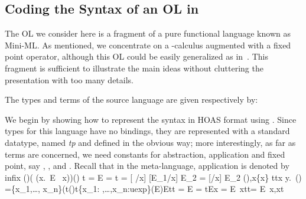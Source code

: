 \documentclass[final]{svjour3}
\begin{document}
\subsection{Coding the Syntax of an OL in \hybrid}
\label{ssec:coding}

The OL we consider here is a fragment of
a pure functional language known as Mini-ML\@.  As mentioned, we
concentrate on a -calculus augmented with a fixed point operator,
although this OL could be easily generalized as in~\cite{Pfenning01book}.
This fragment is sufficient to illustrate the main ideas without
cluttering the presentation with too many details.


The types and terms of the source language are given respectively by:

We begin by showing how to represent the syntax in HOAS format using
\hybrid. Since  types for this language have no
bindings, they are represented with a standard datatype, named
\textit{tp} and defined in the obvious way;
more interestingly, as far as terms are
concerned, we need constants for
abstraction,   application and fixed point, say ,
, and .
Recall that in the meta-language, application is denoted by infix
\con{}()( (\lambda x.\ E
\ x))()\lambda\lambda\lambda\lambda\encode{\Gamma}
{\cdot}\Gamma\decode{\Gamma} \cdott\Gamma{}\alpha\GammaE\Gamma{}t\encode{} = E\decode{} = t\encode{\cdot}{\cdot}\decode{\cdot}{\cdot}\encode {} = {[\encode
    /x]} \; \encode {}\decode \Gamma
  {[E_1/x] {E_2}} = {[\decode {}/x]} \; \decode \Gamma
  {E_2} {()}\expr{}\Gamma,x\Gamma\cup \{x\}\Gamma\uexp{\isterm{\_}{\_}} \fs \bool\uexp\Gamma\vdash tt\lambda x y.\, (\expr\fs\expr\fs\expr)\fs\expr\abst{}{} \Gamma=\{x_1,\ldots, x_n\}(\proper \Gamma{}\Gamma\vdash t(\proper\Gamma\Implies{})\Gamma\vdash t\Gamma \{x_1: \uexp,\dots,x_n:uexp\}(\proper\Gamma\Implies\isterm\Gamma E)\decode\Gamma Et\Gamma\vdash t\encode\Gamma{\decode
  \Gamma E} = E\decode\Gamma{\encode \Gamma t} = t\proper\Gamma\Implies\isterm\Gamma E\proper\Gamma\Implies\isterm{\Gamma}{(\llrec{E\ x})}\isterm{\Gamma,x}{(E~x)}x\proper {(\Gamma, x)}\decode{\Gamma} {\llrec{(E\ x)}} = \rec{\decode{\Gamma,x} {E\ x}}\decode{\Gamma,x} {E\ x}tt=\decode{\Gamma,x} {E\ x}\Gamma,x\vdash t\mathbf{fix}\Gamma
\end{document}
